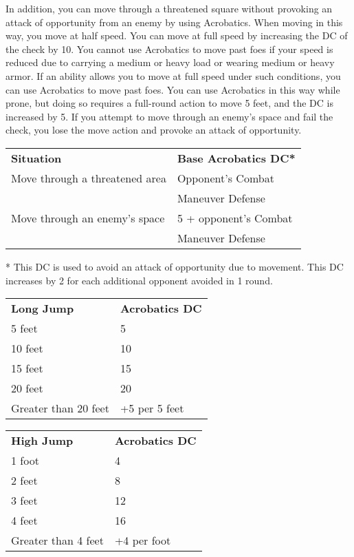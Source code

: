 In addition, you can move through a threatened square without provoking an attack of opportunity from an enemy by using Acrobatics. When moving in this way, you move at half speed. You can move at full speed by increasing the DC of the check by 10. You cannot use Acrobatics to move past foes if your speed is reduced due to carrying a medium or heavy load or wearing medium or heavy armor. If an ability allows you to move at full speed under such conditions, you can use Acrobatics to move past foes. You can use Acrobatics in this way while prone, but doing so requires a full-round action to move 5 feet, and the DC is increased by 5. If you attempt to move through an enemy's space and fail the check, you lose the move action and provoke an attack of opportunity.
\begin{table}
 \sffamily
 \begin{tabular}{ll}
 \textbf{Situation} & \textbf{Base Acrobatics DC*} \\
  Move through a threatened area & Opponent's Combat \\
                                 & Maneuver Defense \\
  Move through an enemy's space & 5 + opponent's Combat \\
                                & Maneuver Defense \\
 \end{tabular}
   * This DC is used to avoid an attack of opportunity due to movement. This DC increases by 2 for each additional opponent avoided in 1 round.
\end{table}

\begin{table}
 \sffamily
 \begin{tabular}{ll}
\textbf{Long Jump} & \textbf{Acrobatics DC} \\
5 feet & 5\\
10 feet & 10\\
15 feet & 15\\
20 feet &  20\\
Greater than 20 feet & +5 per 5 feet \\
 \end{tabular}
\end{table}

\begin{table}
\sffamily
\begin{tabular}{ll}
\textbf{High Jump} & \textbf{Acrobatics DC}\\
1 foot & 4\\
2 feet & 8\\
3 feet & 12\\
4 feet & 16\\
Greater than 4 feet & +4 per foot\\
\end{tabular}
\end{table}

